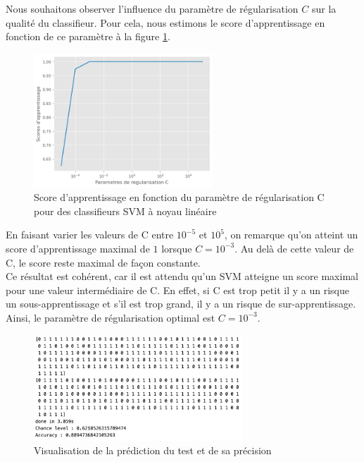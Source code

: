 \documentclass[a4paper,12pt]{article}
\begin{document}
Nous souhaitons observer l'influence du paramètre de régularisation $C$ sur la qualité du classifieur. 
Pour cela, nous estimons le score d'apprentissage en fonction de ce paramètre à la figure \ref{fig : C}.

\begin{figure}[H]
    \centering
    \includegraphics[width=0.6\textwidth]{Images/erreur_prediction.png}
    \caption{Score d'apprentissage en fonction du paramètre de régularisation C pour des classifieurs SVM à noyau linéaire}\label{fig : C}
\end{figure}

En faisant varier les valeurs de C entre $10^{-5}$ et $10^{5}$, on remarque qu'on atteint un score d'apprentissage maximal de $1$ lorsque $C=10^{-3}$.
Au delà de cette valeur de C, le score reste maximal de façon constante.\\
Ce résultat est cohérent, car il est attendu qu’un SVM atteigne un score maximal pour une valeur intermédiaire de 
C. En effet, si C est trop petit il y a un risque un sous-apprentissage et s'il est trop grand, il y a un risque de sur-apprentissage.\\
Ainsi, le paramètre de régularisation optimal est $C=10^{-3}$.\\

\begin{figure}[H]    
    \centering    
    \includegraphics[width=0.7\textwidth]{Images/label_prediction.png}
    \caption{Visualisation de la prédiction du test et de sa précision}\label{fig : precision}
\end{figure}
\end{document}

